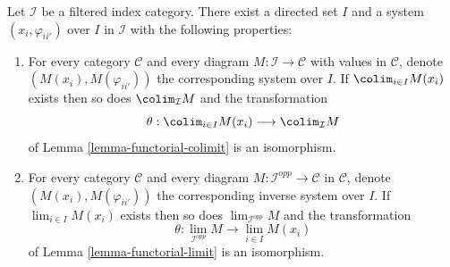 \begin{lemma}
\label{lemma-directed-category-system}
Let $\mathcal{I}$ be a filtered index category.
There exist a directed set $I$
and a system $(x_i, \varphi_{ii'})$ over $I$ in $\mathcal{I}$
with the following properties:
\begin{enumerate}
\item For every category $\mathcal{C}$ and every diagram
$M : \mathcal{I} \to \mathcal{C}$ with values in $\mathcal{C}$,
denote $(M(x_i), M(\varphi_{ii'}))$
the corresponding system over $I$. If
$\colim_{i \in I} M(x_i)$ exists then so does
$\colim_\mathcal{I} M$ and the transformation
$$
\theta :
\colim_{i \in I} M(x_i)
\longrightarrow
\colim_\mathcal{I} M
$$
of Lemma \ref{lemma-functorial-colimit} is an isomorphism.
\item For every category $\mathcal{C}$ and every diagram
$M : \mathcal{I}^{opp} \to \mathcal{C}$ in $\mathcal{C}$, denote
$(M(x_i), M(\varphi_{ii'}))$ the corresponding inverse system
over $I$. If $\lim_{i \in I} M(x_i)$ exists then so does
$\lim_{\mathcal{I}^{opp}} M$ and the transformation
$$
\theta :
\lim_{\mathcal{I}^{opp}} M
\longrightarrow
\lim_{i \in I} M(x_i)
$$
of Lemma \ref{lemma-functorial-limit} is an isomorphism.
\end{enumerate}
\end{lemma}

